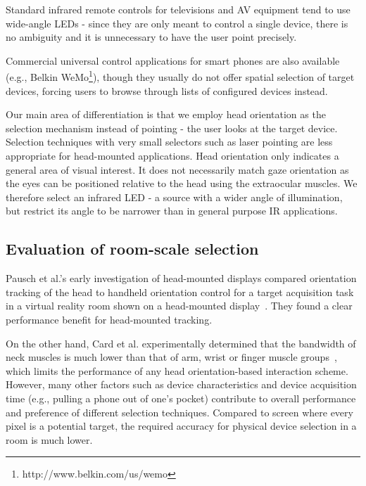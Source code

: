 Standard infrared remote controls for televisions and AV equipment tend to use wide-angle LEDs - since they are only meant to control a single device, there is no ambiguity  and it is unnecessary to have the user point precisely.

Commercial universal control applications for smart phones are also available (e.g., Belkin WeMo\footnote{http://www.belkin.com/us/wemo}), though they usually do not offer spatial selection of target devices, forcing users to browse through lists of configured devices instead.

Our main area of differentiation is that we employ head orientation as the selection mechanism instead of pointing - the user looks at the target device. Selection techniques with very small selectors such as laser pointing are less appropriate for head-mounted applications. Head orientation only indicates a general area of visual interest. It does not necessarily match gaze orientation as the eyes can be positioned relative to the head using the extraocular muscles. We therefore select an infrared LED - a source with a wider angle of illumination, but restrict its angle to be narrower than in general purpose IR applications.



\subsection{Evaluation of room-scale selection}
Pausch et al.'s early investigation of head-mounted displays compared orientation tracking of the head to handheld orientation control for a target acquisition task in a virtual reality room shown on a head-mounted display~\cite{pausch_user_1993}. They found a clear performance benefit for head-mounted tracking.

On the other hand, Card et al. experimentally determined that the bandwidth of neck muscles is much lower than that of arm, wrist or finger muscle groups~\cite{card_morphological_1991}, which limits the performance of any head orientation-based interaction scheme. However, many other factors such as device characteristics and device acquisition time (e.g., pulling a phone out of one's pocket) contribute to overall performance and preference of different selection techniques. Compared to screen where every pixel is a potential target, the required accuracy for physical device selection in a room is much lower.

